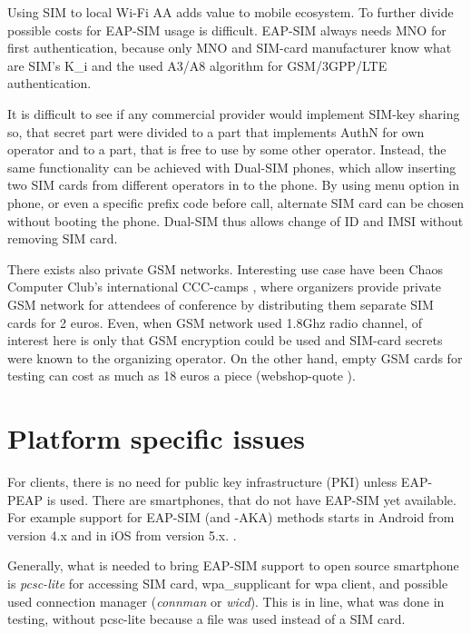 \documentclass[12pt,a4paper,english]{tutthesis}
\begin{document}
Using SIM to local Wi-Fi AA adds value to mobile ecosystem.
To further divide possible costs for EAP-SIM usage
is difficult.
EAP-SIM always needs MNO for first authentication,
because only MNO and SIM-card manufacturer know 
what are SIM's K\_i and the used A3/A8 algorithm
for GSM/3GPP/LTE authentication.

It is difficult to see if any commercial provider would implement
SIM-key sharing so, that secret part were divided to a part that
implements AuthN for own operator and to a part, that is free to use by
some other operator.  Instead, the same functionality can be achieved with
Dual-SIM phones, which allow inserting two SIM cards from different
operators in to the phone. By using menu option in phone, or even a
specific prefix code before call, alternate SIM card can be chosen
without booting the phone.
Dual-SIM thus allows change of ID and IMSI without removing SIM card.

There exists also private GSM networks.
Interesting use case have been Chaos Computer Club's international 
CCC-camps \cite{ccc}, where organizers 
provide private GSM network for attendees of conference
by distributing them separate SIM cards for 2 euros.
Even, when GSM network used 1.8Ghz radio channel, of interest here is
only that GSM encryption could be used and SIM-card secrets were known to
the organizing operator.
On the other hand, empty GSM cards for testing can cost as much as 
18 euros a piece (webshop-quote \cite{smartjac-testsim}).


\section{Platform specific issues}
\label{sec-6-4}

For clients, there is no need for public key infrastructure (PKI) 
unless EAP-PEAP is used.
There are smartphones, that do not have EAP-SIM yet available.
For example support for
EAP-SIM (and -AKA) methods starts in Android from version 4.x and in
iOS from version 5.x. \cite{sim-support}.


Generally, what is  needed to bring EAP-SIM support to open source
smartphone is \emph{pcsc-lite} for accessing SIM card, wpa\_supplicant for
wpa client, and possible used connection manager (\emph{connman} or
\emph{wicd}). This is in line, what was done in testing, without pcsc-lite
because a file was used instead of a SIM card.
\end{document}
